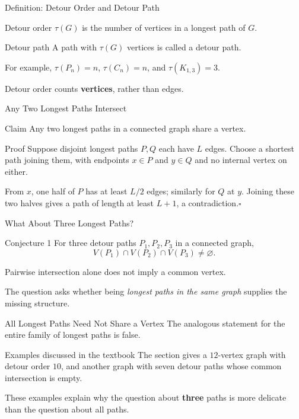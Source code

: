 \documentclass[aspectratio=169,11pt]{beamer}
\begin{document}
\begin{frame}{Definition: Detour Order and Detour Path}
\large
\begin{block}{Detour order}
$\tau(G)$ is the number of vertices in a longest path of $G$.
\end{block}
\begin{block}{Detour path}
A path with $\tau(G)$ vertices is called a detour path.
\end{block}
\medskip For example, $\tau(P_n)=n$, $\tau(C_n)=n$, and $\tau(K_{1,3})=3$.\par\medskip Detour order counts \textbf{vertices}, rather than edges.
\end{frame}

\begin{frame}{Any Two Longest Paths Intersect}
\large
\begin{block}{Claim}
Any two longest paths in a connected graph share a vertex.
\end{block}
\begin{block}{Proof}
\normalsize Suppose disjoint longest paths $P,Q$ each have $L$ edges. Choose a shortest path joining them, with endpoints $x\in P$ and $y\in Q$ and no internal vertex on either.\par\medskip From $x$, one half of $P$ has at least $L/2$ edges; similarly for $Q$ at $y$. Joining these two halves gives a path of length at least $L+1$, a contradiction.\hfill$\square$
\end{block}

\end{frame}

\begin{frame}{What About Three Longest Paths?}
\large
\begin{block}{Conjecture 1}
For three detour paths $P_1,P_2,P_3$ in a connected graph,\[V(P_1)\cap V(P_2)\cap V(P_3)\ne\varnothing.\]
\end{block}
\medskip Pairwise intersection alone does not imply a common vertex.\par\medskip The question asks whether being \emph{longest paths in the same graph} supplies the missing structure.
\end{frame}

\begin{frame}{All Longest Paths Need Not Share a Vertex}
\large
The analogous statement for the entire family of longest paths is false.\begin{block}{Examples discussed in the textbook}
The section gives a $12$-vertex graph with detour order $10$, and another graph with seven detour paths whose common intersection is empty.
\end{block}
\medskip These examples explain why the question about \textbf{three} paths is more delicate than the question about all paths.
\end{frame}
\end{document}
